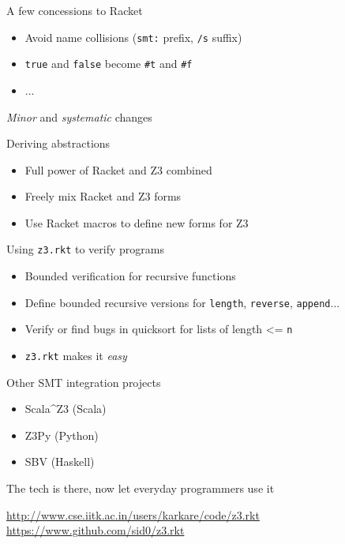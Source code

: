 \documentclass{beamer}
\begin{document}
\begin{frame}{A few concessions to Racket}
\begin{itemize}
\item Avoid name collisions (\texttt{smt:} prefix, \texttt{/s} suffix)
\item \texttt{true} and \texttt{false} become \texttt{\#t} and \texttt{\#f}
\item ...
\end{itemize}
\pause
\textit{Minor} and \textit{systematic} changes
\end{frame}

\begin{frame}{Deriving abstractions}
\begin{itemize}
\item Full power of Racket and Z3 combined
\item Freely mix Racket and Z3 forms
\pause
\item Use Racket macros to define new forms for Z3
\end{itemize}
\end{frame}

\begin{frame}{Using \texttt{z3.rkt} to verify programs}
\begin{itemize}
\item Bounded verification for recursive functions
\item Define bounded recursive versions for \texttt{length}, \texttt{reverse}, \texttt{append}...
\pause
\item Verify or find bugs in quicksort for lists of length <= \texttt{n}
\pause
\item \texttt{z3.rkt} makes it \textit{easy}
\end{itemize}
\end{frame}

\begin{frame}{Other SMT integration projects}
\begin{itemize}
\item Scala\textasciicircum Z3 (Scala)
\item Z3Py (Python)
\item SBV (Haskell)
\end{itemize}
\pause
The tech is there, now let everyday programmers use it
\begin{center}
\url{http://www.cse.iitk.ac.in/users/karkare/code/z3.rkt}
\url{https://www.github.com/sid0/z3.rkt}
\end{center}
\end{frame}
\end{document}
